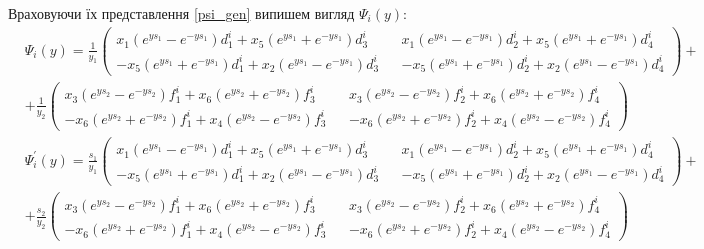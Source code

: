 Враховуючи їх представлення \eqref{psi_gen} випишем вигляд $\Psi_i(y)$:
\begin{align*}
    &\Psi_i(y) = \frac{1}{y_1} \begin{pmatrix}
        x_1(e^{y s_1} - e^{-y s_1})d_1^i + x_5(e^{y s_1} + e^{-y s_1})d_3^i && x_1(e^{y s_1} - e^{-y s_1})d_2^i + x_5(e^{y s_1} + e^{-y s_1})d_4^i \\
        -x_5(e^{y s_1} + e^{-y s_1})d_1^i + x_2(e^{y s_1} - e^{-y s_1})d_3^i && -x_5(e^{y s_1} + e^{-y s_1})d_2^i + x_2(e^{y s_1} - e^{-y s_1})d_4^i
    \end{pmatrix} + \\
    &+ \frac{1}{y_2} \begin{pmatrix}
        x_3(e^{y s_2} - e^{-y s_2})f_1^i + x_6(e^{y s_2} + e^{-y s_2})f_3^i && x_3(e^{y s_2} - e^{-y s_2})f_2^i + x_6(e^{y s_2} + e^{-y s_2})f_4^i \\
        -x_6(e^{y s_2} + e^{-y s_2})f_1^i + x_4(e^{y s_2} - e^{-y s_2})f_3^i && -x_6(e^{y s_2} + e^{-y s_2})f_2^i + x_4(e^{y s_2} - e^{-y s_2})f_4^i
    \end{pmatrix}
\end{align*}
\begin{align*}
    &\Psi_i^{'}(y) = \frac{s_1}{y_1} \begin{pmatrix}
        x_1(e^{y s_1} - e^{-y s_1})d_1^i + x_5(e^{y s_1} + e^{-y s_1})d_3^i && x_1(e^{y s_1} - e^{-y s_1})d_2^i + x_5(e^{y s_1} + e^{-y s_1})d_4^i \\
        -x_5(e^{y s_1} + e^{-y s_1})d_1^i + x_2(e^{y s_1} - e^{-y s_1})d_3^i && -x_5(e^{y s_1} + e^{-y s_1})d_2^i + x_2(e^{y s_1} - e^{-y s_1})d_4^i
    \end{pmatrix} + \\
    &+ \frac{s_2}{y_2} \begin{pmatrix}
        x_3(e^{y s_2} - e^{-y s_2})f_1^i + x_6(e^{y s_2} + e^{-y s_2})f_3^i && x_3(e^{y s_2} - e^{-y s_2})f_2^i + x_6(e^{y s_2} + e^{-y s_2})f_4^i \\
        -x_6(e^{y s_2} + e^{-y s_2})f_1^i + x_4(e^{y s_2} - e^{-y s_2})f_3^i && -x_6(e^{y s_2} + e^{-y s_2})f_2^i + x_4(e^{y s_2} - e^{-y s_2})f_4^i
    \end{pmatrix}
\end{align*}

